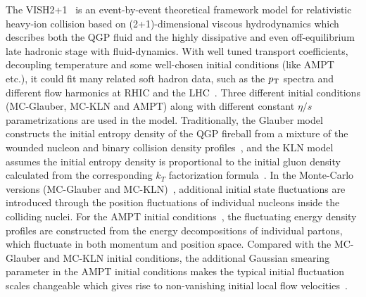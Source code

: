 \documentclass[ALICE,manyauthors]{cernphprep}
\begin{document}
The VISH2+1~\cite{Zhu:2016puf} is an event-by-event theoretical framework model for relativistic heavy-ion collision based on (2+1)-dimensional viscous hydrodynamics which describes both the QGP fluid and the highly dissipative and even off-equilibrium late hadronic stage with fluid-dynamics. With well tuned transport coefficients, decoupling temperature  and some well-chosen initial conditions (like {AMPT}~\cite{Xu:2016hmp,Bhalerao:2015iya,Pang:2012he} etc.), it could fit many related soft hadron data, such as the $p_{\textnormal{T}}{}$ spectra and different flow harmonics at RHIC and the LHC~\cite{Qiu:2011hf, Shen:2010uy, Shen:2011eg, Bhalerao:2015iya}.
Three different initial conditions ({MC-Glauber}, {MC-KLN} and {AMPT}) along with different constant $\eta/s$ parametrizations are used in the model. 
Traditionally, the Glauber model constructs the initial entropy density of the QGP fireball from a mixture of the wounded nucleon and binary collision density profiles~\cite{Kolb:2000sd}, and the {KLN} model assumes the initial entropy density is proportional to the initial gluon density calculated from the corresponding $k_T$ factorization formula~\cite{Kharzeev:2000ph}. In the Monte-Carlo versions ({MC-Glauber} and {MC-KLN})~\cite{Miller:2007ri,Drescher:2006ca,Hirano:2009ah}, additional initial state fluctuations are introduced through the position fluctuations of individual nucleons inside the colliding nuclei. For the {AMPT} initial conditions~\cite{Bhalerao:2015iya,Pang:2012he,Xu:2016hmp}, the fluctuating energy density profiles are constructed from the energy decompositions of individual partons, which fluctuate in both momentum and position space. Compared with the {MC-Glauber} and {MC-KLN} initial conditions, the additional Gaussian smearing parameter in the {AMPT} initial conditions makes the typical initial fluctuation scales changeable which gives rise to non-vanishing initial local flow velocities~\cite{Pang:2012he}.
\end{document}
